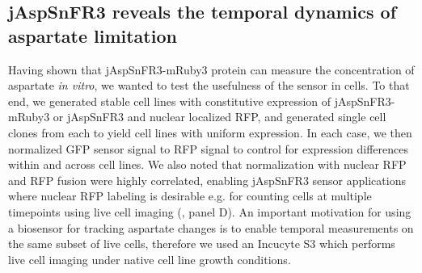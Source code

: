 \documentclass[9pt,lineno]{elife}
\begin{document}
\begin{figure}[ht!]
\label{figsupp:f1S4}

\end{figure}









\subsection{jAspSnFR3 reveals the temporal dynamics of aspartate limitation}
Having shown that jAspSnFR3-mRuby3 protein can measure the concentration of aspartate \textit{in vitro}, we wanted to test the usefulness of the sensor in cells.
To that end, we generated stable cell lines with constitutive expression of jAspSnFR3-mRuby3 or jAspSnFR3 and nuclear localized RFP, and generated single cell clones from each to yield cell lines with uniform expression.
In each case, we then normalized GFP sensor signal to RFP signal to control for expression differences within and across cell lines.
We also noted that normalization with nuclear RFP and RFP fusion were highly correlated, enabling jAspSnFR3 sensor applications where nuclear RFP labeling is desirable e.g. for counting cells at multiple timepoints using live cell imaging (, panel D).
An important motivation for using a biosensor for tracking aspartate changes is to enable temporal measurements on the same subset of live cells, therefore we used an Incucyte S3 which performs live cell imaging under native cell line growth conditions.
\end{document}
